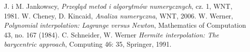 \documentclass[10pt,wide]{mwart}
\theoremstyle{definition}
\begin{document}
\begin{thebibliography}{9}
\itemsep10pt
 J. i M. Jankowscy, \emph{Przegląd metod i algorytmów numerycznych}, cz. 1, WNT, 1981.
 W. Cheney, D. Kincaid, \emph{Analiza numeryczna}, WNT, 2006.
 W. Werner, \emph{Polynomial interpolation: Lagrange versus Newton}, Mathematics of Computation 43, no. 167 (1984).
 C. Schneider, W. Werner \emph{Hermite interpolation: The barycentric approach}, Computing 46: 35, Springer, 1991.
\end{thebibliography}
\end{document}
